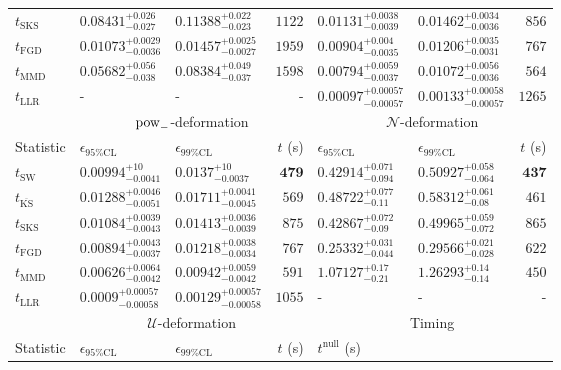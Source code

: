 \begin{tabular}{l|llr|llr}
	$t_{\mathrm{SKS}}$ & $0.08431_{-0.027}^{+0.026}$ & $0.11388_{-0.023}^{+0.022}$ & $1122$ & $0.01131_{-0.0039}^{+0.0038}$ & $0.01462_{-0.0036}^{+0.0034}$ & $856$ \\
	$t_{\mathrm{FGD}}$ & ${\mathbf{0.01073_{-0.0036}^{+0.0029}}}$ & ${\mathbf{0.01457_{-0.0027}^{+0.0025}}}$ & $1959$ & $0.00904_{-0.0035}^{+0.004}$ & $0.01206_{-0.0031}^{+0.0035}$ & $767$ \\
	$t_{\mathrm{MMD}}$ & $0.05682_{-0.038}^{+0.056}$ & $0.08384_{-0.037}^{+0.049}$ & $1598$ & ${\mathbf{0.00794_{-0.0037}^{+0.0059}}}$ & ${\mathbf{0.01072_{-0.0036}^{+0.0056}}}$ & $564$ \\
	$t_{\mathrm{LLR}}$ & - & - & - & $0.00097_{-0.00057}^{+0.00057}$ & $0.00133_{-0.00057}^{+0.00058}$ & $1265$ \\
	\toprule
	\multicolumn{1}{c}{} & \multicolumn{3}{c}{$\rm{pow}_{-}$-deformation} & \multicolumn{3}{c}{$\mathcal{N}$-deformation} \\
	Statistic & $\epsilon_{95\%\mathrm{CL}}$ & $\epsilon_{99\%\mathrm{CL}}$ & $t$ (s) & $\epsilon_{95\%\mathrm{CL}}$ & $\epsilon_{99\%\mathrm{CL}}$ & $t$ (s) \\
	\midrule
	$t_{\mathrm{SW}}$ & $0.00994_{-0.0041}^{+10}$ & $0.0137_{-0.0037}^{+10}$ & ${\mathbf{479}}$ & $0.42914_{-0.094}^{+0.071}$ & $0.50927_{-0.064}^{+0.058}$ & ${\mathbf{437}}$ \\
	$t_{\overline{\mathrm{KS}}}$ & $0.01288_{-0.0051}^{+0.0046}$ & $0.01711_{-0.0045}^{+0.0041}$ & $569$ & $0.48722_{-0.11}^{+0.077}$ & $0.58312_{-0.08}^{+0.061}$ & $461$ \\
	$t_{\mathrm{SKS}}$ & $0.01084_{-0.0043}^{+0.0039}$ & $0.01413_{-0.0039}^{+0.0036}$ & $875$ & $0.42867_{-0.09}^{+0.072}$ & $0.49965_{-0.072}^{+0.059}$ & $865$ \\
	$t_{\mathrm{FGD}}$ & $0.00894_{-0.0037}^{+0.0043}$ & $0.01218_{-0.0034}^{+0.0038}$ & $767$ & ${\mathbf{0.25332_{-0.044}^{+0.031}}}$ & ${\mathbf{0.29566_{-0.028}^{+0.021}}}$ & $622$ \\
	$t_{\mathrm{MMD}}$ & ${\mathbf{0.00626_{-0.0042}^{+0.0064}}}$ & ${\mathbf{0.00942_{-0.0042}^{+0.0059}}}$ & $591$ & $1.07127_{-0.21}^{+0.17}$ & $1.26293_{-0.14}^{+0.14}$ & $450$ \\
	$t_{\mathrm{LLR}}$ & $0.0009_{-0.00058}^{+0.00057}$ & $0.00129_{-0.00058}^{+0.00057}$ & $1055$ & - & - & - \\
	\toprule
	\multicolumn{1}{c}{} & \multicolumn{3}{c}{$\mathcal{U}$-deformation} & \multicolumn{3}{c}{Timing} \\
	Statistic & $\epsilon_{95\%\mathrm{CL}}$ & $\epsilon_{99\%\mathrm{CL}}$ & $t$ (s) & $t^{\mathrm{null}}$ (s) \\

\end{tabular}
